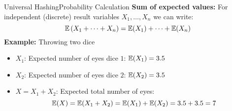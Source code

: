


\begin{frame}{Universal Hashing}{Probability Calculation}
   \textbf{Sum of expected values:}
   For independent (discrete) result variables {\color{Mittel-Blau}$X_1,\dots,X_n$} we can write:
     {\color{Mittel-Blau}\[\mathbb{E}\left(X_1+\dots+X_n\right)
       = \mathbb{E}(X_1) + \dots + \mathbb{E}(X_n)\]}
   \textbf{Example:} Throwing two dice
   \begin{itemize}
     \item<3->
       {\color{Mittel-Blau}$X_1$}: Expected number of eyes dice {\color{Mittel-Blau}$1$}: {\color{Mittel-Blau}$\mathbb{E}(X_1) = 3.5$}
     \item<4->
       {\color{Mittel-Blau}$X_2$}: Expected number of eyes dice {\color{Mittel-Blau}$2$}: {\color{Mittel-Blau}$\mathbb{E}(X_2) = 3.5$}
     \item<5->
       {\color{Mittel-Blau}$X = X_1 + X_2$}: Expected total number of eyes:
       {\color{Mittel-Blau}\[\mathbb{E}(X)
         = \mathbb{E}(X_1 + X_2)
         = \mathbb{E}(X_1) + \mathbb{E}(X_2) = 3.5 + 3.5 = 7\]}
   \end{itemize}
\end{frame}

